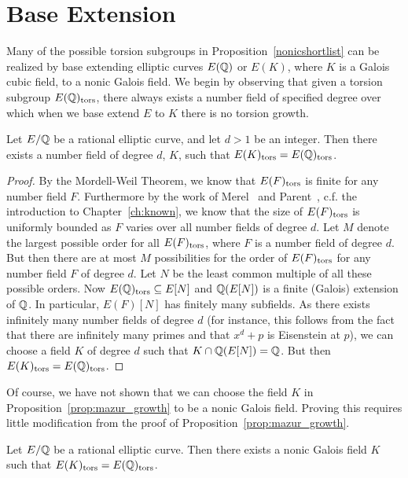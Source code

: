 \section{Base Extension\label{sec:nonicbaseext}}

Many of the possible torsion subgroups in Proposition~\ref{nonicshortlist} can be realized by base extending elliptic curves $E(\mathbb{Q})$ or $E(K)$, where $K$ is a Galois cubic field, to a nonic Galois field. We begin by observing that given a torsion subgroup $E(\mathbb{Q})_{\text{tors}}$, there always exists a number field of specified degree over which when we base extend $E$ to $K$ there is no torsion growth.


\begin{prop} \label{prop:mazur_growth}
Let $E/\mathbb{Q}$ be a rational elliptic curve, and let $d>1$ be an integer. Then there exists a number field of degree $d$, $K$, such that $E(K)_{\text{tors}}= E(\mathbb{Q})_{\text{tors}}$. 
\end{prop}

\begin{proof} 
By the Mordell-Weil Theorem, we know that $E(F)_{\text{tors}}$ is finite for any number field $F$. Furthermore by the work of Merel~\cite{merel96} and Parent~\cite{parent99}, c.f. the introduction to Chapter~\ref{ch:known}, we know that the size of $E(F)_{\text{tors}}$ is uniformly bounded as $F$ varies over all number fields of degree $d$. Let $M$ denote the largest possible order for all $E(F)_{\text{tors}}$, where $F$ is a number field of degree $d$. But then there are at most $M$ possibilities for the order of $E(F)_{\text{tors}}$ for any number field $F$ of degree $d$. Let $N$ be the least common multiple of all these possible orders. Now $E(\mathbb{Q})_{\text{tors}} \subseteq E[N]$ and $\mathbb{Q}(E[N])$ is a finite (Galois) extension of $\mathbb{Q}$. In particular, $E(F)[N]$ has finitely many subfields. As there exists infinitely many number fields of degree $d$ (for instance, this follows from the fact that there are infinitely many primes and that $x^d + p$ is Eisenstein at $p$), we can choose a field $K$ of degree $d$ such that $K \cap \mathbb{Q}(E[N])= \mathbb{Q}$. But then $E(K)_{\text{tors}}= E(\mathbb{Q})_{\text{tors}}$.
\end{proof}


Of course, we have not shown that we can choose the field $K$ in Proposition~\ref{prop:mazur_growth} to be a nonic Galois field. Proving this requires little modification from the proof of Proposition~\ref{prop:mazur_growth}. 


\begin{cor} \label{cor:nonicrationalext}
Let $E/\mathbb{Q}$ be a rational elliptic curve. Then there exists a nonic Galois field $K$ such that $E(K)_{\text{tors}}= E(\mathbb{Q})_{\text{tors}}$.
\end{cor}

